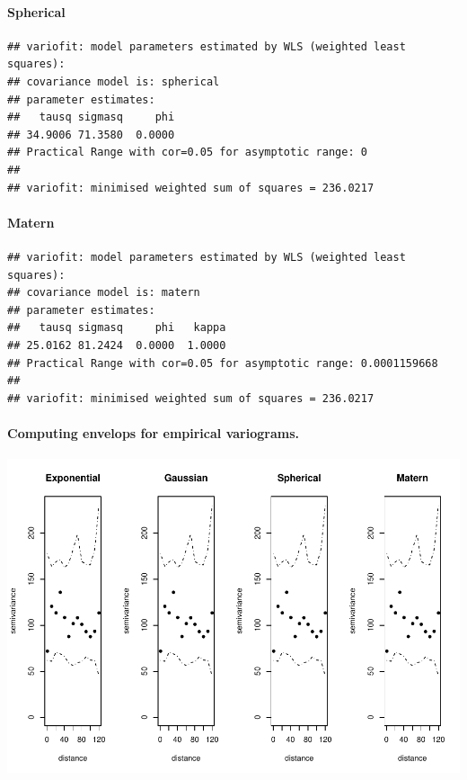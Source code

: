 \documentclass[
]{article}
\begin{document}
\hypertarget{spherical}{%
\paragraph{Spherical}\label{spherical}}

\begin{verbatim}
## variofit: model parameters estimated by WLS (weighted least squares):
## covariance model is: spherical
## parameter estimates:
##   tausq sigmasq     phi 
## 34.9006 71.3580  0.0000 
## Practical Range with cor=0.05 for asymptotic range: 0
## 
## variofit: minimised weighted sum of squares = 236.0217
\end{verbatim}

\hypertarget{matern}{%
\paragraph{Matern}\label{matern}}

\begin{verbatim}
## variofit: model parameters estimated by WLS (weighted least squares):
## covariance model is: matern
## parameter estimates:
##   tausq sigmasq     phi   kappa 
## 25.0162 81.2424  0.0000  1.0000 
## Practical Range with cor=0.05 for asymptotic range: 0.0001159668
## 
## variofit: minimised weighted sum of squares = 236.0217
\end{verbatim}

\hypertarget{computing-envelops-for-empirical-variograms.}{%
\paragraph{Computing envelops for empirical
variograms.}\label{computing-envelops-for-empirical-variograms.}}

\includegraphics{Assignment_1_files/figure-latex/unnamed-chunk-33-1.pdf}
\end{document}
